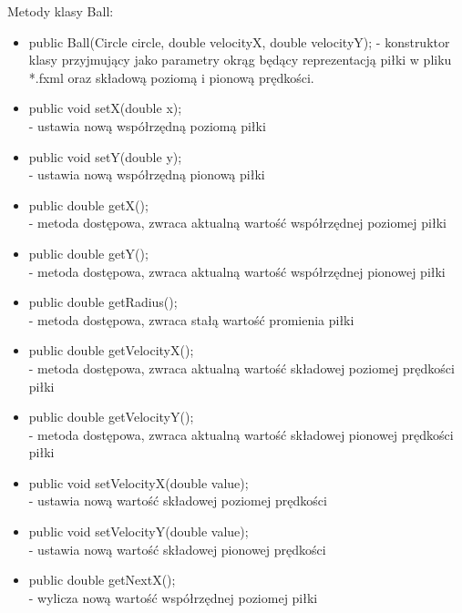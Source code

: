 \documentclass[a4paper]{article}
\begin{document}
\bigskip
Metody klasy Ball:
\begin{itemize}

\item public Ball(Circle circle, double velocityX, double velocityY);
- konstruktor klasy przyjmujący jako parametry okrąg będący reprezentacją piłki w pliku *.fxml oraz składową poziomą i pionową prędkości.
    
\item public void setX(double x);\\
- ustawia nową współrzędną poziomą piłki
    
\item public void setY(double y);\\
- ustawia nową współrzędną pionową piłki
    
\item public double getX();\\
- metoda dostępowa, zwraca aktualną wartość współrzędnej poziomej piłki
    
\item public double getY();\\
- metoda dostępowa, zwraca aktualną wartość współrzędnej pionowej piłki
    
\item public double getRadius();\\
- metoda dostępowa, zwraca stałą wartość promienia piłki
    
\item public double getVelocityX();\\
- metoda dostępowa, zwraca aktualną wartość składowej poziomej prędkości piłki
    
\item public double getVelocityY();\\
- metoda dostępowa, zwraca aktualną wartość składowej pionowej prędkości piłki
    
\item public void setVelocityX(double value);\\
- ustawia nową wartość składowej poziomej prędkości
    
\item public void setVelocityY(double value);\\
- ustawia nową wartość składowej pionowej prędkości
    
\item public double getNextX();\\
- wylicza nową wartość współrzędnej poziomej piłki


\end{itemize}
\end{document}

